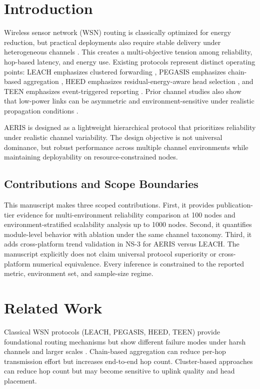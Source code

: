 ﻿\documentclass[sensors,article,submit,moreauthors,pdftex]{Definitions/mdpi}
\begin{document}
\section{Introduction}
Wireless sensor network (WSN) routing is classically optimized for energy reduction, but practical deployments also require stable delivery under heterogeneous channels \cite{Akyildiz2002Survey,Rault2016Energy,Kandris2020}. This creates a multi-objective tension among reliability, hop-based latency, and energy use. Existing protocols represent distinct operating points: LEACH emphasizes clustered forwarding \cite{Heinzelman2000LEACH}, PEGASIS emphasizes chain-based aggregation \cite{Lindsey2002PEGASIS}, HEED emphasizes residual-energy-aware head selection \cite{Younis2004HEED}, and TEEN emphasizes event-triggered reporting \cite{Manjeshwar2001TEEN}. Prior channel studies also show that low-power links can be asymmetric and environment-sensitive under realistic propagation conditions \cite{Zuniga2004,Zuniga2007Asymmetry,Baccour2012RLQE}.

AERIS is designed as a lightweight hierarchical protocol that prioritizes reliability under realistic channel variability. The design objective is not universal dominance, but robust performance across multiple channel environments while maintaining deployability on resource-constrained nodes.

\subsection*{Contributions and Scope Boundaries}
This manuscript makes three scoped contributions. First, it provides publication-tier evidence for multi-environment reliability comparison at 100 nodes and environment-stratified scalability analysis up to 1000 nodes. Second, it quantifies module-level behavior with ablation under the same channel taxonomy. Third, it adds cross-platform trend validation in NS-3 for AERIS versus LEACH. The manuscript explicitly does not claim universal protocol superiority or cross-platform numerical equivalence. Every inference is constrained to the reported metric, environment set, and sample-size regime.

\section{Related Work}
Classical WSN protocols (LEACH, PEGASIS, HEED, TEEN) provide foundational routing mechanisms but show different failure modes under harsh channels and larger scales \cite{Heinzelman2002LEACH,Lindsey2002PEGASIS,Younis2004HEED,Kandris2020}. Chain-based aggregation can reduce per-hop transmission effort but increases end-to-end hop count. Cluster-based approaches can reduce hop count but may become sensitive to uplink quality and head placement.
\end{document}
